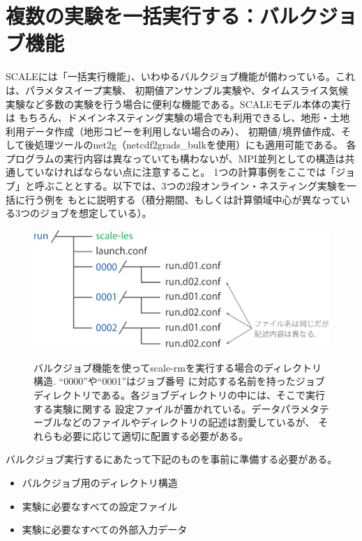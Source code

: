 \section{複数の実験を一括実行する：バルクジョブ機能} \label{sec:bulkjob}

SCALEには「一括実行機能」、いわゆるバルクジョブ機能が備わっている。これは、パラメタスイープ実験、
初期値アンサンブル実験や、タイムスライス気候実験など多数の実験を行う場合に便利な機能である。SCALEモデル本体の実行は
もちろん、ドメインネスティング実験の場合でも利用できるし、地形・土地利用データ作成（地形コピーを利用しない場合のみ）、
初期値/境界値作成、そして後処理ツールのnet2g（netcdf2grads\_bulkを使用）にも適用可能である。
各プログラムの実行内容は異なっていても構わないが、MPI並列としての構造は共通していなければならない点に注意すること。
1つの計算事例をここでは「ジョブ」と呼ぶこととする。以下では、3つの2段オンライン・ネスティング実験を一括に行う例を
もとに説明する（積分期間、もしくは計算領域中心が異なっている3つのジョブを想定している）。


\begin{figure}[t]
\begin{center}
  \includegraphics[width=0.6\hsize]{./figure/bulkjob_directory_structure.eps}\\
  \caption{バルクジョブ機能を使ってscale-rmを実行する場合のディレクトリ構造. ``0000''や``0001''はジョブ番号
           に対応する名前を持ったジョブディレクトリである。各ジョブディレクトリの中には、そこで実行する実験に関する
           設定ファイルが置かれている。データパラメタテーブルなどのファイルやディレクトリの記述は割愛しているが、
           それらも必要に応じて適切に配置する必要がある。}
  \label{fig_bulkjob}
\end{center}
\end{figure}


バルクジョブ実行するにあたって下記のものを事前に準備する必要がある。
\begin{itemize}
\item バルクジョブ用のディレクトリ構造
\item 実験に必要なすべての設定ファイル
\item 実験に必要なすべての外部入力データ
\end{itemize}

